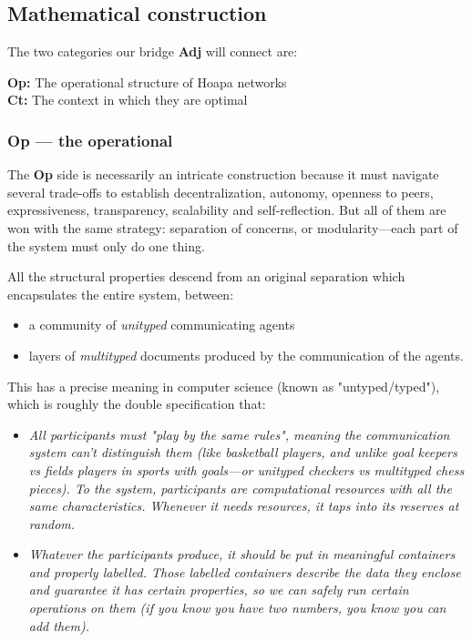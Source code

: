 \documentclass[11pt]{article}
\begin{document}
\subsection{Mathematical construction}

The two categories our bridge \textbf{Adj} will connect are:

\textbf{Op:} The operational structure of Hoapa networks \\ \textbf{Ct:} The context in which they are optimal

\subsubsection{Op --- the operational}

The \textbf{Op} side is necessarily an intricate construction because it must navigate several trade-offs to establish decentralization, autonomy, openness to peers, expressiveness, transparency, scalability and self-reflection. But all of them are won with the same strategy: separation of concerns, or modularity---each part of the system must only do one thing.

All the structural properties descend from an original separation which encapsulates the entire system, between:

\begin{itemize}

\item a community of \emph{unityped} communicating agents

\item layers of \emph{multityped} documents produced by the communication of the agents.

\end{itemize}

This has a precise meaning in computer science (known as "untyped/typed"), which is roughly the double specification that:

\begin{itemize}

\item \emph{All participants must "play by the same rules", meaning the communication system can't distinguish them (like basketball players, and unlike goal keepers vs fields players in sports with goals---or unityped checkers vs multityped chess pieces). To the system, participants are computational resources with all the same characteristics. Whenever it needs resources, it taps into its reserves at random.}

\item \emph{Whatever the participants produce, it should be put in meaningful containers and properly labelled. Those labelled containers describe the data they enclose and guarantee it has certain properties, so we can safely run certain operations on them (if you know you have two numbers, you know you can add them).}

\end{itemize}
\end{document}
